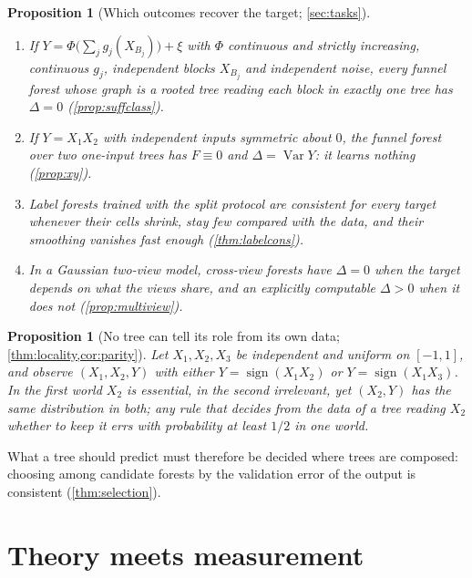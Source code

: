 \documentclass[11pt]{article}
\newtheorem{proposition}[theorem]{Proposition}
\theoremstyle{definition}
\theoremstyle{remark}
\newcommand{\Var}{\operatorname{Var}}
\begin{document}
\begin{proposition}[Which outcomes recover the target; \cref{sec:tasks}]\label{prop:tasks}
\leavevmode
\begin{enumerate}[label=(\alph*),leftmargin=*,noitemsep]
\item If $Y=\Phi\bigl(\sum_jg_j(X_{B_j})\bigr)+\xi$ with $\Phi$ continuous and strictly
  increasing, continuous $g_j$, independent blocks $X_{B_j}$ and independent noise, every
  funnel forest whose graph is a rooted tree reading each block in exactly one tree has
  $\Delta=0$ (\cref{prop:suffclass}).
\item If $Y=X_1X_2$ with independent inputs symmetric about $0$, the funnel forest over two
  one-input trees has $F\equiv0$ and $\Delta=\Var Y$: it learns nothing (\cref{prop:xy}).
\item Label forests trained with the split protocol are consistent for every target
  whenever their cells shrink, stay few compared with the data, and their smoothing
  vanishes fast enough (\cref{thm:labelcons}).
\item In a Gaussian two-view model, cross-view forests have $\Delta=0$ when the target
  depends on what the views share, and an explicitly computable $\Delta>0$ when it does not
  (\cref{prop:multiview}).
\end{enumerate}
\end{proposition}

\begin{proposition}[No tree can tell its role from its own data;
\cref{thm:locality,cor:parity}]\label{prop:local}
Let $X_1,X_2,X_3$ be independent and uniform on $[-1,1]$, and observe $(X_1,X_2,Y)$ with
either $Y=\operatorname{sign}(X_1X_2)$ or $Y=\operatorname{sign}(X_1X_3)$.  In the first world
$X_2$ is essential, in the second irrelevant, yet $(X_2,Y)$ has the same distribution in
both; any rule that decides from the data of a tree reading $X_2$ whether to keep it errs
with probability at least $1/2$ in one world.
\end{proposition}

What a tree should predict must therefore be decided where trees are composed: choosing
among candidate forests by the validation error of the output is consistent
(\cref{thm:selection}).

\section{Theory meets measurement}\label{sec:measure}
\end{document}
